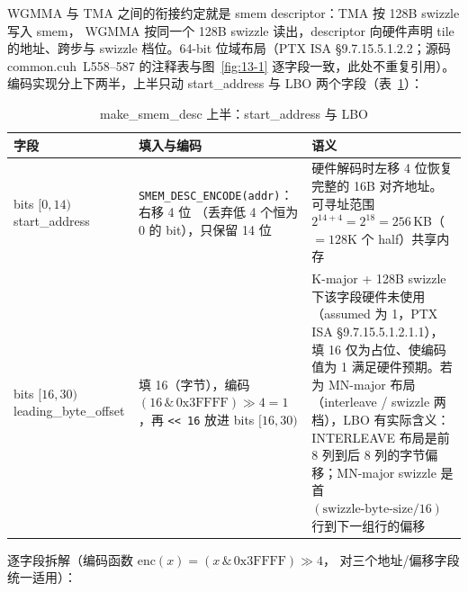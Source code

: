 WGMMA 与 TMA 之间的衔接约定就是 smem descriptor：TMA 按 128B swizzle 写入 smem，
WGMMA 按同一个 128B swizzle 读出，descriptor 向硬件声明 tile 的地址、跨步与
swizzle 档位。64-bit 位域布局（PTX ISA §9.7.15.5.1.2.2；源码
common.cuh~L558--587 的注释表与图~\ref{fig:13-1} 逐字段一致，此处不重复引用）。
编码实现分上下两半，上半只动 start\_address 与 LBO 两个字段（表~\ref{tab:13-desc-upper}）：

\begin{table}[htbp]
\centering
\caption{make\_smem\_desc 上半：start\_address 与 LBO}
\label{tab:13-desc-upper}
\small
\begin{tabular}{@{}p{3.7cm}p{3.3cm}p{10.45cm}@{}}
\toprule
字段 & 填入与编码 & 语义 \\
\midrule
bits $[0,14)$ start\_address &
  \texttt{SMEM\_\allowbreak{}DESC\_\allowbreak{}ENCODE(addr)}：右移 4 位
  （丢弃低 4 个恒为 0 的 bit），只保留 14 位 &
  硬件解码时左移 4 位恢复完整的 16B 对齐地址。可寻址范围
  $2^{14+4} = 2^{18} = 256$\,KB（$=128$K 个 half）共享内存 \\
bits $[16,30)$ leading\_byte\_offset &
  填 16（字节），编码 $(16 \,\&\, \mathrm{0x3FFFF}) \gg 4 = 1$，再
  \texttt{<< 16} 放进 bits $[16, 30)$ &
  K-major + 128B swizzle 下该字段硬件未使用（assumed 为 1，PTX ISA
  §9.7.15.5.1.2.1.1），填 16 仅为占位、使编码值为 1 满足硬件预期。若为
  MN-major 布局（interleave / swizzle 两档），LBO 有实际含义：INTERLEAVE 布局是前
  8 列到后 8 列的字节偏移；MN-major swizzle 是首
  $(\text{swizzle-byte-size}/16)$ 行到下一组行的偏移 \\
\bottomrule
\end{tabular}
\end{table}



逐字段拆解（编码函数 $\mathrm{enc}(x) = (x \,\&\, \mathrm{0x3FFFF}) \gg 4$，
对三个地址/偏移字段统一适用）：

